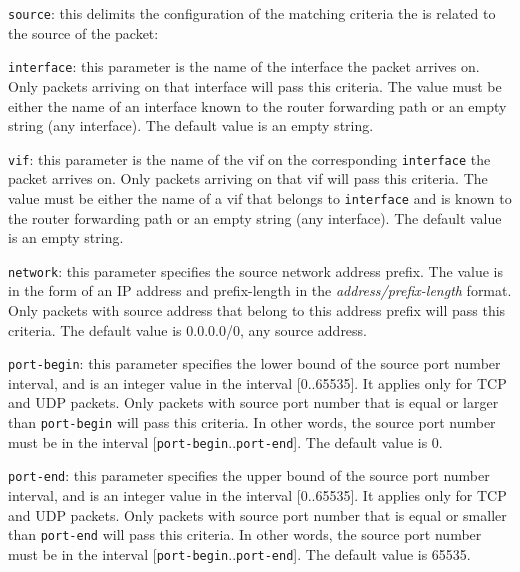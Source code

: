 \begin{description}
\begin{description}
\item{\tt source}: this delimits the configuration of the matching
  criteria the is related to the source of the packet:
\begin{description}
\item{\tt interface}: this parameter is the name of the interface
  the packet arrives on. Only packets arriving on that interface will
  pass this criteria. The value must be either the name of an interface
  known to the router forwarding path or an empty string (\ie any
  interface). The default value is an empty string.
\item{\tt vif}: this parameter is the name of the vif on the
  corresponding {\tt interface} the packet arrives on. Only packets
  arriving on that vif will pass this criteria. The value must be either
  the name of a vif that belongs to {\tt interface} and is known to the
  router forwarding path or an empty string (\ie any interface). The
  default value is an empty string.
\item{\tt network}: this parameter specifies the source network address
  prefix. The value is in the form of an IP address and prefix-length in
  the {\it address/prefix-length} format. Only packets with source
  address that belong to this address prefix will pass this criteria.
  The default value is 0.0.0.0/0, \ie any source address.
\item{\tt port-begin}: this parameter specifies the lower bound of the
  source port number interval, and is an integer value in the interval
  [0..65535]. It applies only for TCP and UDP packets.
  Only packets with source port number that is equal or larger than
  {\tt port-begin} will pass this criteria. In other words, the source
  port number must be in the interval
  [{\tt port-begin}..{\tt port-end}]. The default value is 0.
\item{\tt port-end}: this parameter specifies the upper bound of the
  source port number interval, and is an integer value in the interval
  [0..65535]. It applies only for TCP and UDP packets.
  Only packets with source port number that is equal or smaller than
  {\tt port-end} will pass this criteria. In other words, the source
  port number must be in the interval
  [{\tt port-begin}..{\tt port-end}]. The default value is 65535.
\end{description}


\end{description}
\end{description}
